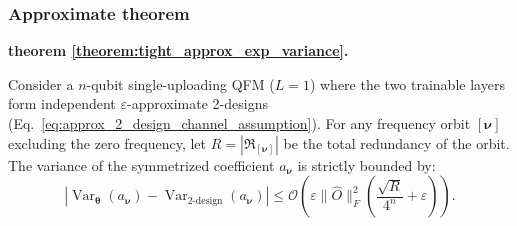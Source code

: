 \documentclass[%
 reprint,
 amsmath,amssymb,
 aps,
 pra,
]{revtex4-2}
\theoremstyle{definition}
\newenvironment{restate}[2]{%
  \par\noindent\textbf{#1 \ref{#2}. }\itshape%
}{\par\medskip}
\begin{document}
\subsubsection{Approximate theorem}
\label{app:approximate_theorem}
\begin{restate}{theorem}{theorem:tight_approx_exp_variance}
Consider a $n$-qubit single-uploading QFM ($L=1$) where the two trainable layers form independent $\varepsilon$-approximate 2-designs (Eq.~\ref{eq:approx_2_design_channel_assumption}). For any frequency orbit $[\bm{\nu}]$ excluding the zero frequency, let $R = |\mathfrak{R}_{[\bm{\nu}]}|$ be the total redundancy of the orbit. The variance of the symmetrized coefficient $a_{\bm{\nu}}$ is strictly bounded by:
\begin{equation}
\left|
\operatorname{Var}_{\bm{\theta}}(a_{\bm{\nu}})
-
\operatorname{Var}_{\text{2-design}}(a_{\bm{\nu}})
\right|
\leq
\mathcal{O}\left( \varepsilon \|\hat{O}\|_F^2 \left( \frac{\sqrt{R}}{4^n} + \varepsilon \right) \right).
\end{equation}
\end{restate}
\end{document}
